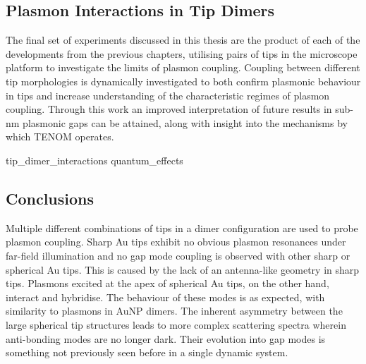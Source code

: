 \documentclass[12pt, a4paper, twoside]{book}
\begin{document}
\begin{singlespace}
\color{white}\chapter{Plasmon Interactions in Tip Dimers}
\label{ch:tip_interactions}
\end{singlespace}


The final set of experiments discussed in this thesis are the product of each of the developments from the previous chapters, utilising pairs of tips in the microscope platform to investigate the limits of plasmon coupling. Coupling between different tip morphologies is dynamically investigated to both confirm plasmonic behaviour in tips and increase understanding of the characteristic regimes of plasmon coupling. Through this work an improved interpretation of future results in sub-nm plasmonic gaps can be attained, along with insight into the mechanisms by which TENOM operates.

{tip_dimer_interactions}
{quantum_effects}

\section{Conclusions}

Multiple different combinations of tips in a dimer configuration are used to probe plasmon coupling. Sharp Au tips exhibit no obvious plasmon resonances under far-field illumination and no gap mode coupling is observed with other sharp or spherical Au tips. This is caused by the lack of an antenna-like geometry in sharp tips. Plasmons excited at the apex of spherical Au tips, on the other hand, interact and hybridise. The behaviour of these modes is as expected, with similarity to plasmons in AuNP dimers. The inherent asymmetry between the large spherical tip structures leads to more complex scattering spectra wherein anti-bonding modes are no longer dark. Their evolution into gap modes is something not previously seen before in a single dynamic system.
\end{document}
